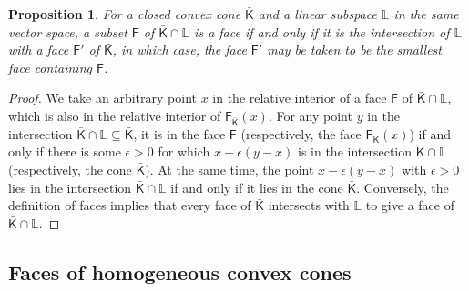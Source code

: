 \documentclass[oneside]{amsart}
\theoremstyle{plain}
\newtheorem{proposition}[theorem]{Proposition}
\theoremstyle{definition}
\theoremstyle{remark}
\numberwithin{equation}{section}
\begin{document}
\begin{proposition}\label{proposition:facesofslices}
For a closed convex cone $\bar{\mathsf{K}}$ and a linear subspace
$\mathbb{L}$ in the same vector space, a subset $\mathsf{F}$ of
$\bar{\mathsf{K}} \cap \mathbb{L}$ is a face if and only if it is the
intersection of $\mathbb{L}$ with a face $\mathsf{F}'$ of
$\bar{\mathsf{K}}$, in which case, the face $\mathsf{F}'$ may be taken to
be the smallest face containing $\mathsf{F}$.
\end{proposition}
\begin{proof}
We take an arbitrary point $x$ in the relative interior of a face
$\mathsf{F}$ of $\bar{\mathsf{K}} \cap \mathbb{L}$, which is also in the
relative interior of $\mathsf{F}_{\bar{\mathsf{K}}}(x)$. For any point $y$
in the intersection $\bar{\mathsf{K}} \cap \mathbb{L} \subseteq
\bar{\mathsf{K}}$, it is in the face $\mathsf{F}$ (respectively, the face
$\mathsf{F}_{\bar{\mathsf{K}}}(x)$) if and only if there is some $\epsilon
> 0$ for which $x - \epsilon (y - x)$ is in the intersection
$\bar{\mathsf{K}} \cap \mathbb{L}$ (respectively, the cone
$\bar{\mathsf{K}}$). At the same time, the point $x - \epsilon (y - x)$
with $\epsilon > 0$ lies in the intersection $\bar{\mathsf{K}} \cap
\mathbb{L}$ if and only if it lies in the cone $\bar{\mathsf{K}}$.
Conversely, the definition of faces implies that every face of
$\bar{\mathsf{K}}$ intersects with $\mathbb{L}$ to give a face of
$\bar{\mathsf{K}} \cap \mathbb{L}$.
\end{proof}

\subsection{Faces of homogeneous convex cones}
\label{section:facialstructureprimal}
\end{document}
